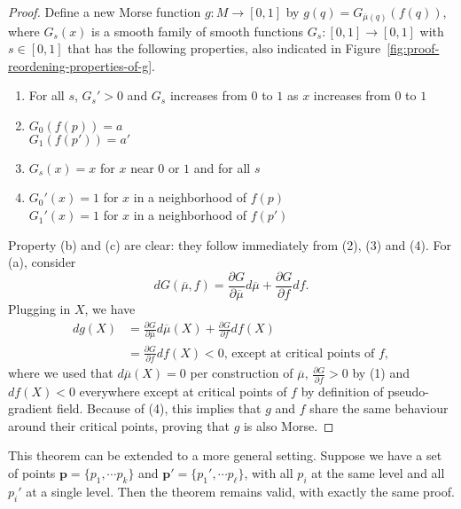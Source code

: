 \begin{proof}
    Define a new Morse function $g: M \to  [0,1]$ by $g(q) = G_{\overline{\mu}(q)}(f(q))$, where $G_{s}(x)$ is a smooth family of smooth functions $G_s: [0,1] \to  [0,1]$ with $s \in [0,1]$ that has the following properties, also indicated in Figure~\ref{fig:proof-reordening-properties-of-g}.
    \begin{marginfigure}
        \centering
        \caption{Necessary properties of $G$ in the proof on reordering critical points are indicated in yellow.}
        \label{fig:proof-reordening-properties-of-g}
    \end{marginfigure}
    \begin{enumerate}[(1)]
        \item For all $s$, $G_s' > 0$ and $G_s$ increases from $0$ to  $1$ as $x$ increases from  $0$ to  $1$
        \item  $G_0(f(p)) = a$\\ $G_1(f(p')) = a'$
        \item  $G_s(x) = x$ for $x$ near  $0$ or  $1$ and for all $s$ 
        \item  $G_0'(x) = 1$ for $x$  in a neighborhood of $f(p)$\\
        $G_1'(x) = 1$ for $x$  in a neighborhood of $f(p')$
    \end{enumerate}
    Property (b) and (c) are clear: they follow immediately from (2), (3) and (4).
    For (a), consider
    \[
        dG(\overline{\mu}, f) = \frac{\partial G}{\partial \overline{\mu}}  d\overline{\mu} + \frac{\partial G}{\partial f}  df
    .\] 
    Plugging in $X$, we have
    \begin{align*}
        dg(X) &= \frac{\partial G}{\partial \overline{\mu}}  d\overline{\mu}(X) + \frac{\partial G}{\partial f}  df(X)\\
              &= \frac{\partial G}{\partial f}  df(X) < 0 \text{, except at critical points of $f$}
    ,\end{align*} 
    where we used that $d\overline{\mu}(X) = 0$ per construction of $\overline{\mu}$, $\frac{\partial G}{\partial f} > 0$ by (1) and $df(X) < 0$ everywhere except at critical points of $f$ by definition of pseudo-gradient field.
    Because of (4), this implies that $g$ and $f$ share the same behaviour around their critical points, proving that $g$ is also Morse.
\end{proof}

\begin{remark}
    This theorem can be extended to a more general setting. Suppose we have a set of points $\mathbf{p} = \{p_1, \cdots p_k\}$ and $\mathbf{p}' = \{p_1', \cdots p_\ell\}$, with all $p_i$ at the same level and all $p_i'$ at a single level.
    Then the theorem remains valid, with exactly the same proof.
\end{remark}


